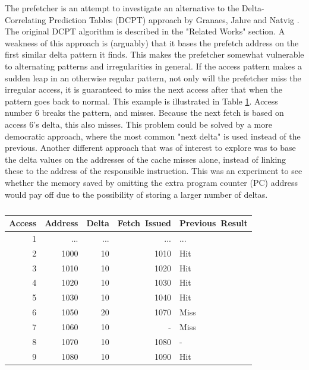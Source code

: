 

The prefetcher is an attempt to investigate an alternative to the Delta-Correlating Prediction Tables (DCPT) approach by Granaes, Jahre and Natvig \cite{reference:jahre}. The original DCPT algorithm is described in the "Related Works" section. A weakness of this approach is (arguably) that it bases the prefetch address on the first similar delta pattern it finds. This makes the prefetcher somewhat vulnerable to alternating patterns and irregularities in general. If the access pattern makes a sudden leap in an otherwise regular pattern, not only will the prefetcher miss the irregular access, it is guaranteed to miss the next access after that when the pattern goes back to normal. This example is illustrated in Table \ref{table:breakDCPT}. Access number 6 breaks the pattern, and misses. Because the next fetch is based on access 6's delta, this also misses. This problem could be solved by a more democratic approach, where the most common "next delta" is used instead of the previous. 
Another different approach that was of interest to explore was to base the delta values on the addresses of the cache misses alone, instead of linking these to the address of the responsible instruction. This was an experiment to see whether the memory saved by omitting the extra program counter (PC) address would pay off due to the possibility of storing a larger number of deltas.
\begin{table}[!t]
\renewcommand{\arraystretch}{1.3}
\caption{}
\label{table:breakDCPT}
\centering
\begin{tabular}{|r|r|r|r|l|}
\hline
\bfseries Access & \bfseries Address & \bfseries Delta & \bfseries Fetch~Issued & \bfseries Previous~Result\\
\hline
\hline
1 & ... & ... & ... & ...\\
2 & 1000 & 10 & 1010 & Hit\\
3 & 1010 & 10 & 1020 & Hit\\
4 & 1020 & 10 & 1030 & Hit\\
5 & 1030 & 10 & 1040 & Hit\\
6 & 1050 & 20 & 1070 & Miss\\
7 & 1060 & 10 & - 	 & Miss\\
8 & 1070 & 10 & 1080 & -\\
9 & 1080 & 10 & 1090 & Hit\\
\hline
\end{tabular}
\end{table}

